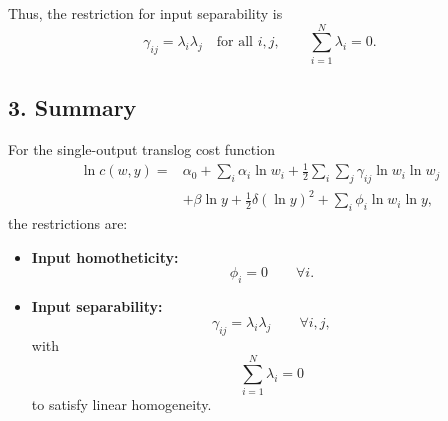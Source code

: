 Thus, the restriction for input separability is
\[
\boxed{
\gamma_{ij}=\lambda_i\lambda_j
\quad \text{for all } i,j,
\qquad
\sum_{i=1}^N \lambda_i=0.
}
\]

\subsection*{3. Summary}

For the single-output translog cost function
\[
\begin{aligned}
\ln c(w,y)
=
&\alpha_0
+
\sum_i \alpha_i \ln w_i
+
\frac{1}{2}\sum_i\sum_j \gamma_{ij}\ln w_i \ln w_j\\
&+
\beta \ln y
+
\frac{1}{2}\delta (\ln y)^2
+
\sum_i \phi_i \ln w_i \ln y,
\end{aligned}
\]
the restrictions are:

\begin{itemize}
\item \textbf{Input homotheticity:}
\[
\boxed{\phi_i=0 \qquad \forall i.}
\]

\item \textbf{Input separability:}
\[
\boxed{\gamma_{ij}=\lambda_i\lambda_j \qquad \forall i,j,}
\]
with
\[
\boxed{\sum_{i=1}^N \lambda_i=0}
\]
to satisfy linear homogeneity.
\end{itemize}

